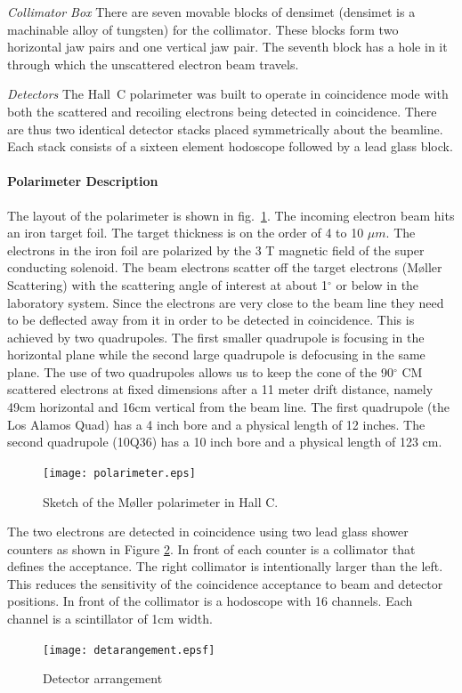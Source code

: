 {\sl Collimator Box} There are seven movable blocks of densimet (densimet is
a machinable alloy of tungsten) for the collimator. These blocks form two
horizontal jaw pairs and one vertical jaw pair. The seventh block has a
hole in it through which the unscattered electron beam travels.

{\sl Detectors} The Hall~C polarimeter was built to operate in coincidence
mode with both the scattered and recoiling electrons being detected in
coincidence. There are thus two identical detector stacks placed symmetrically
about the beamline. Each stack consists of a sixteen element hodoscope
followed by a lead glass block.

\paragraph{Polarimeter Description}
The layout of the polarimeter is shown in fig.~\ref{polscetch}.
The incoming electron beam hits an iron target foil. The target thickness
is on the order of 4 to 10 $\mu m$. The electrons in the iron foil
are polarized by the 3 T magnetic field of the super conducting solenoid.
The beam electrons scatter off 
the target electrons (M\o ller Scattering) 
with the scattering angle of interest at about
1$^{\circ}$ or below in the laboratory system. Since the electrons
are very close to the beam line they need to be deflected away from
it in order to be detected in coincidence. This is achieved by
two quadrupoles. The first smaller quadrupole is focusing in the
horizontal plane  while the
second large quadrupole is defocusing in the same plane. The use of two quadrupoles
allows us to keep the cone of the 90$^{\circ}$ CM scattered electrons 
at fixed dimensions after a 11 meter drift distance, namely
49cm horizontal and 16cm vertical from the beam line.
The first quadrupole (the Los Alamos Quad) has a 4 inch bore and a
physical length of 12 inches. The second quadrupole (10Q36) has a 10
inch bore and a physical length of 123 cm.
\begin{figure}[htp]
\begin{center}
\texttt{[image: polarimeter.eps]}
\caption{Sketch of the M\o ller polarimeter in Hall C.\label{polscetch}}
\end{center}
\end{figure}
The two electrons are detected in coincidence using two lead glass 
shower counters as shown in Figure \ref{detarr}. In front of each counter is a collimator that defines
the acceptance. The right collimator is intentionally larger
than the left. This reduces the sensitivity of the coincidence 
acceptance to beam and detector positions. In front of the collimator
is a hodoscope with 16 channels. Each channel is a scintillator of 1cm
width.
\begin{figure}
\texttt{[image: detarangement.epsf]}
\begin{center}
\parbox{10cm}{
\caption{Detector arrangement}\label{detarr}}
\end{center}
\end{figure}

